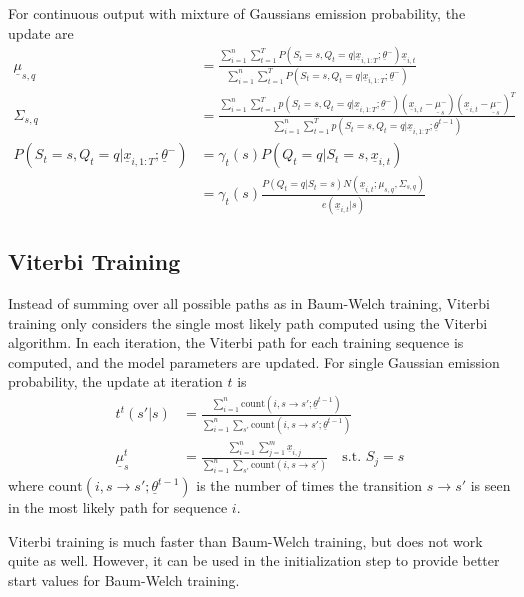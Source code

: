 For continuous output with mixture of Gaussians emission probability, the update
are
\begin{align*}
\underline{\mu}_{s,q} &= \frac{\sum_{i=1}^n\sum_{t=1}^T P(S_t = s, Q_t=q |
\underline{x}_{i, 1:T};\underline{\theta}^-)\underline{x}_{i,
t}}{\sum_{i=1}^n\sum_{t=1}^T P(S_t = s, Q_t=q | \underline{x}_{i,
1:T};\underline{\theta}^-)} \\
\Sigma_{s,q} &= \frac{\sum_{i=1}^n\sum_{t=1}^T p(S_t = s, Q_t=q |
\underline{x}_{i, 1:T};\underline{\theta}^-)(\underline{x}_{i, t} -
\underline{\mu}_s^-)(\underline{x}_{i, t} -
\underline{\mu}_s^-)^T}{\sum_{i=1}^n\sum_{t=1}^T p(S_t = s, Q_t=q |
\underline{x}_{i, 1:T};\underline{\theta}^{t-1})}\\
P(S_t = s, Q_t=q |
\underline{x}_{i, 1:T};\underline{\theta}^-) &=
\gamma_t(s)P(Q_t=q|S_t=s, \underline{x}_{i,t})\\
&=\gamma_t(s)\frac{P(Q_t=q|S_t=s)N(\underline{x}_{i, t};\mu_{s,q},
\Sigma_{s, q})}{e(\underline{x}_{i, t}|s)}
\end{align*}

\subsection{Viterbi Training}\label{sec:viterbi}
Instead of summing over all possible paths as in Baum-Welch training, Viterbi
training only considers the single most likely path computed using the Viterbi
algorithm. In each iteration, the Viterbi path for each training sequence is
computed, and the model parameters are updated. For single Gaussian emission
probability, the update at iteration $t$ is
\begin{align*}
t^t(s'|s) &=\frac{\sum_{i=1}^n \text{count}(i, s\rightarrow s';
\underline{\theta}^{t-1})}{\sum_{i=1}^n \sum_{s'} \text{count}(i,
s\rightarrow s';
\underline{\theta}^{t-1})}\\
\underline{\mu}_s^t &=
\frac{\sum_{i=1}^n\sum_{j=1}^m\underline{x}_{i,j}}{\sum_{i=1}^n\sum_{s'}
\text{count}(i, s\rightarrow \underline{s'})} \quad \text{s.t. } S_j = s
\end{align*}
where $ \text{count}(i, s\rightarrow s';
\underline{\theta}^{t-1})$ is the number of times the transition $s\rightarrow
s'$ is seen in the most likely path for sequence $i$.

Viterbi training is much faster than Baum-Welch training, but does not work
quite as well. However, it can be used in the initialization step to provide
better start values for Baum-Welch training.

